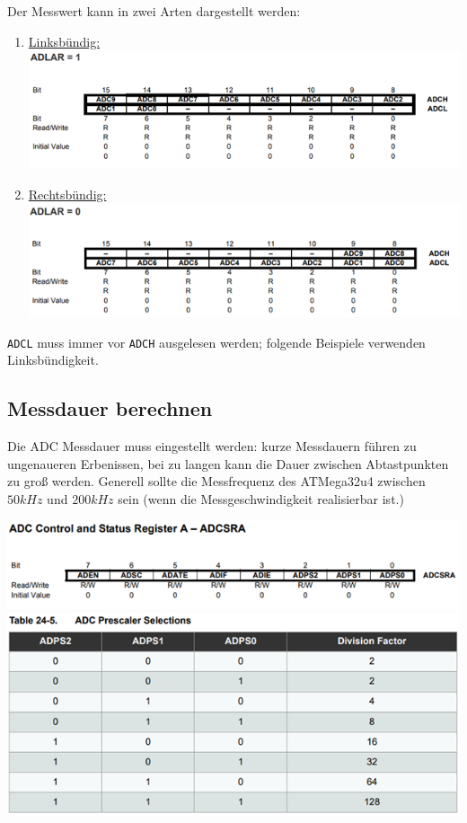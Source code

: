 \newpage

Der Messwert kann in zwei Arten dargestellt werden:
\begin{enumerate}
    \item \underline{Linksbündig:} \\
    \includegraphics{Atmega/ADLAR-1.png}
    \item \underline{Rechtsbündig:} \\
    \includegraphics{Atmega/ADLAR-0.png}
\end{enumerate}

\verb|ADCL| muss immer vor \verb|ADCH| ausgelesen werden; folgende Beispiele verwenden Linksbündigkeit.\\

\newpage

\subsection{Messdauer berechnen}
Die ADC Messdauer muss eingestellt werden: kurze Messdauern führen zu ungenaueren Erbenissen, bei zu langen kann die Dauer zwischen Abtastpunkten zu groß werden. Generell sollte die Messfrequenz des ATMega32u4 zwischen $50kHz$ und $200kHz$ sein (wenn die Messgeschwindigkeit realisierbar ist.)

\includegraphics{Atmega/ADC-Control-Status.png}
\vspace{0.5cm}
\includegraphics{Atmega/ADC-Prescaler.png}

